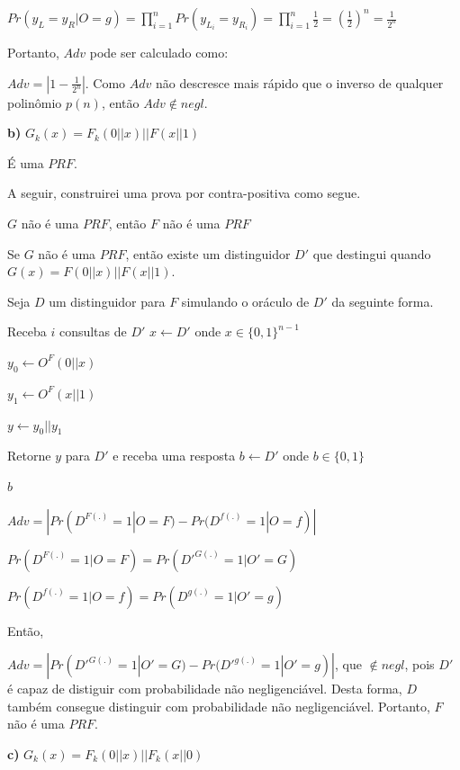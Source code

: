 \documentclass{article}
\begin{document}
    $Pr(y_L = y_R | O = g) = \prod_{i = 1}^{n} Pr(y_{L_i} = y_{R_i}) = \prod_{i = 1}^{n} \frac{1}{2} = (\frac{1}{2})^n = \frac{1}{2^n}$

    Portanto, $Adv$ pode ser calculado como:

    $Adv = | 1 - \frac{1}{2^n}|$. Como $Adv$ não descresce mais rápido que o inverso de qualquer polinômio $p(n)$, então $Adv \notin negl$.

\textbf{b)} $G_k(x) = F_k(0||x) || F(x||1)$

    É uma $PRF$.
    
    A seguir, construirei uma prova por contra-positiva como segue.

    $G$ não é uma $PRF$, então $F$ não é uma $PRF$

    Se $G$ não é uma $PRF$, então existe um distinguidor $D'$ que destingui quando $G(x) = F(0||x) || F(x||1)$.

    Seja $D$ um distinguidor para $F$ simulando o oráculo de $D'$ da seguinte forma.

    \begin{algorithm}[H]
            \caption{Distinguidor $D$}
            Receba $i$ consultas de $D'$
            $x \leftarrow D'$ onde $x \in \{0,1\}^{n-1}$

            $y_0 \leftarrow O^F(0||x)$

            $y_1 \leftarrow O^F(x||1)$

            $y \leftarrow y_0||y_1$

            Retorne $y$ para $D'$ e receba uma resposta $b \leftarrow D'$ onde $b \in \{0,1\}$

            \Return $b$
    \end{algorithm}

    $Adv = | Pr(D^{F(.)} = 1 | O = F) - Pr(D^{f(.)} = 1 | O = f) |$

    $Pr(D^{F(.)} = 1 | O = F) = Pr(D'^{G(.)} = 1 | O' = G)$

    $Pr(D^{f(.)} = 1 | O = f) = Pr(D^{g(.)} = 1 | O' = g)$

    Então,


    $Adv = | Pr(D'^{G(.)} = 1 | O' = G) - Pr(D'^{g(.)} = 1 | O' = g) |$, que $\notin negl$, pois $D'$ é capaz de distiguir com probabilidade não negligenciável. Desta forma, $D$ também consegue distinguir com probabilidade não negligenciável. Portanto, $F$ não é uma $PRF$.  

\textbf{c)} $G_k(x) = F_k(0||x)||F_k(x||0)$
\end{document}
